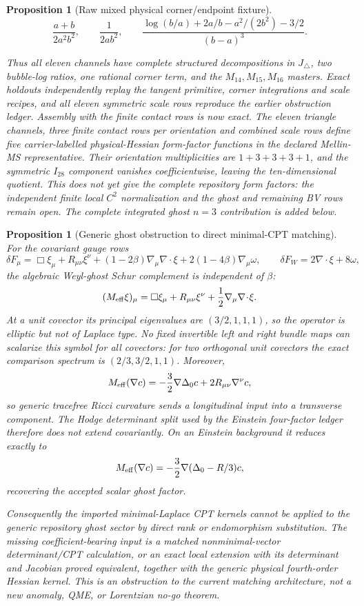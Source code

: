 \documentclass[11pt]{article}
\newtheorem{proposition}[theorem]{Proposition}
\theoremstyle{definition}
\theoremstyle{remark}
\begin{document}
\begin{proposition}[Raw mixed physical corner/endpoint fixture]
\[
 \frac{a+b}{2a^2b^2},\qquad
 \frac1{2ab^2},\qquad
 \frac{\log(b/a)+2a/b-a^2/(2b^2)-3/2}{(b-a)^3}.
\]

Thus all eleven channels have complete structured decompositions in
$J_\triangle$, two bubble-log ratios, one rational corner term, and the
$M_{14},M_{15},M_{16}$ masters.  Exact holdouts independently replay the
tangent primitive, corner integrations and scale recipes, and all eleven
symmetric scale rows reproduce the earlier obstruction ledger.  Assembly
with the finite contact rows is now exact.  The eleven triangle channels,
three finite contact rows per orientation and combined scale rows define five
carrier-labelled physical-Hessian form-factor functions in the declared
Mellin-MS representative.  Their orientation multiplicities are
$1+3+3+3+1$, and the symmetric $I_{28}$ component vanishes coefficientwise,
leaving the ten-dimensional quotient.  This does not yet give the complete
repository form factors: the independent finite local $C^2$ normalization
and the ghost and remaining BV rows remain open.  The complete integrated
ghost $n=3$ contribution is added below.
\end{proposition}

\begin{proposition}[Generic ghost obstruction to direct minimal-CPT matching]
For the covariant gauge rows
\[
 \delta F_\mu=\Box\xi_\mu+R_{\mu\nu}\xi^\nu
 +(1-2\beta)\nabla_\mu\nabla\!\cdot\!\xi
 +2(1-4\beta)\nabla_\mu\omega,
 \qquad
 \delta F_W=2\nabla\!\cdot\!\xi+8\omega,
\]
the algebraic Weyl-ghost Schur complement is independent of $\beta$:
\[
 (M_{\rm eff}\xi)_\mu=
 \Box\xi_\mu+R_{\mu\nu}\xi^\nu
 +\frac12\nabla_\mu\nabla\!\cdot\!\xi .
\]
At a unit covector its principal eigenvalues are
$(3/2,1,1,1)$, so the operator is elliptic but not of Laplace type.  No
fixed invertible left and right bundle maps can scalarize this symbol for
all covectors: for two orthogonal unit covectors the exact comparison
spectrum is $(2/3,3/2,1,1)$.  Moreover,
\[
 M_{\rm eff}(\nabla c)=
 -\frac32\nabla\Delta_0c+2R_{\mu\nu}\nabla^\nu c,
\]
so generic tracefree Ricci curvature sends a longitudinal input into a
transverse component.  The Hodge determinant split used by the Einstein
four-factor ledger therefore does not extend covariantly.  On an Einstein
background it reduces exactly to
\[
 M_{\rm eff}(\nabla c)=-\frac32\nabla(\Delta_0-R/3)c,
\]
recovering the accepted scalar ghost factor.

Consequently the imported minimal-Laplace CPT kernels cannot be applied to
the generic repository ghost sector by direct rank or endomorphism
substitution.  The missing coefficient-bearing input is a matched
nonminimal-vector determinant/CPT calculation, or an exact local extension
with its determinant and Jacobian proved equivalent, together with the
generic physical fourth-order Hessian kernel.  This is an obstruction to the
current matching architecture, not a new anomaly, QME, or Lorentzian
no-go theorem.
\end{proposition}
\end{document}
